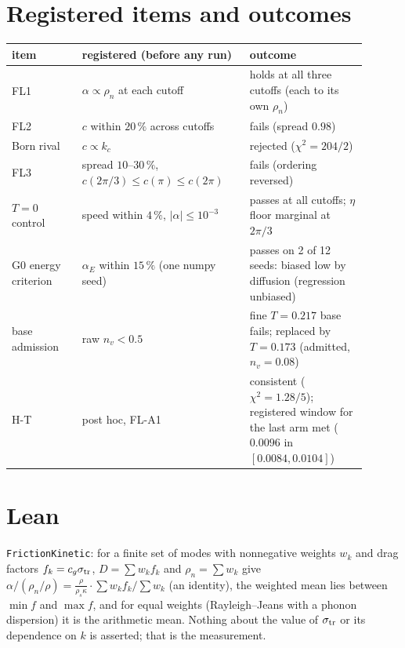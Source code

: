 \documentclass[11pt,a4paper]{article}
\newcommand{\lean}[1]{\texttt{\small #1}}
\begin{document}
\appendix
\section{Registered items and outcomes}\label{app:protocol}
\begin{center}\small\begin{tabular}{p{0.18\linewidth}p{0.42\linewidth}p{0.3\linewidth}}\toprule
item & registered (before any run) & outcome\\\midrule
FL1 & $\alpha\propto\rho_n$ at each cutoff & holds at all three cutoffs (each to its own $\rho_n$)\\
FL2 & $c$ within $20\,\%$ across cutoffs & fails (spread $0.98$)\\
Born rival & $c\propto k_c$ & rejected ($\chi^2=204/2$)\\
FL3 & spread $10$--$30\,\%$, $c(2\pi/3)\le c(\pi)\le c(2\pi)$ & fails (ordering reversed)\\
$T=0$ control & speed within $4\,\%$, $|\alpha|\le10^{-3}$ & passes at all cutoffs; $\eta$ floor marginal at $2\pi/3$\\
G0 energy criterion & $\alpha_E$ within $15\,\%$ (one numpy seed) & passes on 2 of 12 seeds: biased low by diffusion (regression unbiased)\\
base admission & raw $n_v<0.5$ & fine $T=0.217$ base fails; replaced by $T=0.173$ (admitted, $n_v=0.08$)\\
H-T & post hoc, FL-A1 & consistent ($\chi^2=1.28/5$); registered window for the last arm met ($0.0096$ in $[0.0084,0.0104]$)\\\bottomrule\end{tabular}\end{center}

\section{Lean}\label{app:lean}
\lean{FrictionKinetic}: for a finite set of modes with nonnegative weights $w_k$ and drag factors $f_k=c_g\sigma_{\rm tr}$, $D=\sum w_kf_k$ and $\rho_n=\sum w_k$ give
$\alpha/(\rho_n/\rho)=\tfrac{\rho}{\rho_s\kappa}\cdot\sum w_kf_k/\sum w_k$ (an identity), the weighted mean lies between $\min f$ and $\max f$, and for equal weights (Rayleigh--Jeans with a phonon dispersion) it is
the arithmetic mean. Nothing about the value of $\sigma_{\rm tr}$ or its dependence on $k$ is asserted; that is the measurement.
\end{document}
